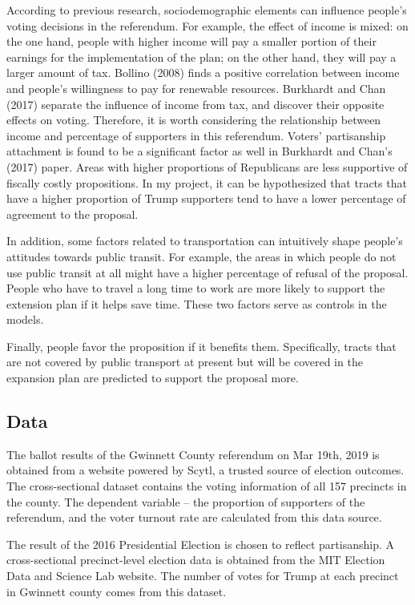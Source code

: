 \documentclass[
]{article}
\begin{document}
According to previous research, sociodemographic elements can influence
people's voting decisions in the referendum. For example, the effect of
income is mixed: on the one hand, people with higher income will pay a
smaller portion of their earnings for the implementation of the plan; on
the other hand, they will pay a larger amount of tax. Bollino (2008)
finds a positive correlation between income and people's willingness to
pay for renewable resources. Burkhardt and Chan (2017) separate the
influence of income from tax, and discover their opposite effects on
voting. Therefore, it is worth considering the relationship between
income and percentage of supporters in this referendum. Voters'
partisanship attachment is found to be a significant factor as well in
Burkhardt and Chan's (2017) paper. Areas with higher proportions of
Republicans are less supportive of fiscally costly propositions. In my
project, it can be hypothesized that tracts that have a higher
proportion of Trump supporters tend to have a lower percentage of
agreement to the proposal.

In addition, some factors related to transportation can intuitively
shape people's attitudes towards public transit. For example, the areas
in which people do not use public transit at all might have a higher
percentage of refusal of the proposal. People who have to travel a long
time to work are more likely to support the extension plan if it helps
save time. These two factors serve as controls in the models.

Finally, people favor the proposition if it benefits them. Specifically,
tracts that are not covered by public transport at present but will be
covered in the expansion plan are predicted to support the proposal
more.

\hypertarget{data}{%
\subsection{Data}\label{data}}

The ballot results of the Gwinnett County referendum on Mar 19th, 2019
is obtained from a website powered by Scytl, a trusted source of
election outcomes. The cross-sectional dataset contains the voting
information of all 157 precincts in the county. The dependent variable
-- the proportion of supporters of the referendum, and the voter turnout
rate are calculated from this data source.

The result of the 2016 Presidential Election is chosen to reflect
partisanship. A cross-sectional precinct-level election data is obtained
from the MIT Election Data and Science Lab website. The number of votes
for Trump at each precinct in Gwinnett county comes from this dataset.
\end{document}
